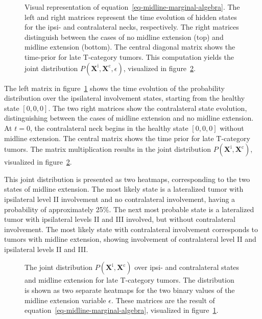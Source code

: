 \documentclass[
  sn-mathphys-num,
]{sn-jnl}
\makeatletter
\newcommand*\pandocbounded[1]{%
  \sbox\pandoc@box{#1}%
  \Gscale@div\@tempa{\textheight}{\dimexpr\ht\pandoc@box+\dp\pandoc@box\relax}%
  \Gscale@div\@tempb{\linewidth}{\wd\pandoc@box}%
  \ifdim\@tempb\p@<\@tempa\p@\let\@tempa\@tempb\fi%
  \ifdim\@tempa\p@<\p@\scalebox{\@tempa}{\usebox\pandoc@box}%
  \else\usebox{\pandoc@box}%
  \fi%
}
\makeatother
\begin{document}
\begin{figure}

\centering{

\pandocbounded{}

}

\caption{\label{fig-model-algebra-equation}Visual representation of
equation~\ref{eq-midline-marginal-algebra}. The left and right matrices
represent the time evolution of hidden states for the ipsi- and
contralateral necks, respectively. The right matrices distinguish
between the cases of no midline extension (top) and midline extension
(bottom). The central diagonal matrix shows the time-prior for late
T-category tumors. This computation yields the joint distribution
\(P \left( \mathbf{X}^\text{i}, \mathbf{X}^\text{c}, \epsilon \right)\),
visualized in figure~\ref{fig-model-state-dist}.}

\end{figure}%

The left matrix in figure~\ref{fig-model-algebra-equation} shows the
time evolution of the probability distribution over the ipsilateral
involvement states, starting from the healthy state \([0,0,0]\). The two
right matrices show the contralateral state evolution, distinguishing
between the cases of midline extension and no midline extension. At
\(t=0\), the contralateral neck begins in the healthy state \([0,0,0]\)
without midline extension. The central matrix shows the time prior for
late T-category tumors. The matrix multiplication results in the joint
distribution
\(P \left( \mathbf{X}^\text{i}, \mathbf{X}^\text{c} \right)\),
visualized in figure~\ref{fig-model-state-dist}.

This joint distribution is presented as two heatmaps, corresponding to
the two states of midline extension. The most likely state is a
lateralized tumor with ipsilateral level II involvement and no
contralateral involvement, having a probability of approximately 25\%.
The next most probable state is a lateralized tumor with ipsilateral
levels II and III involved, but without contralateral involvement. The
most likely state with contralateral involvement corresponds to tumors
with midline extension, showing involvement of contralateral level II
and ipsilateral levels II and III.

\begin{figure}

\centering{

\pandocbounded{}

}

\caption{\label{fig-model-state-dist}The joint distribution
\(P \left( \mathbf{X}^\text{i}, \mathbf{X}^\text{c} \right)\) over ipsi-
and contralateral states and midline extension for late T-category
tumors. The distribution is shown as two separate heatmaps for the two
binary values of the midline extension variable \(\epsilon\). These
matrices are the result of equation~\ref{eq-midline-marginal-algebra},
visualized in figure~\ref{fig-model-algebra-equation}.}

\end{figure}%
\end{document}
